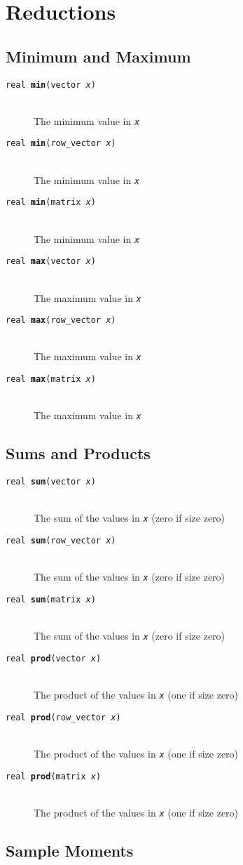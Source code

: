 \documentclass[10pt]{report}
\newcommand{\fitem}[4]{\item[{\tt #1 {\bfseries #2}(#3)}]\mbox{ } \\[4pt] #4}
\newcommand{\farg}[1]{{\tt\slshape #1}}
\begin{document}
\section{Reductions}

\subsection{Minimum and Maximum}

\begin{description}
%
\fitem{real}{min}{vector \farg{x}}{
The minimum value in \farg{x}}
%
\fitem{real}{min}{row\_vector \farg{x}}{
The minimum value in \farg{x}}
%
\fitem{real}{min}{matrix \farg{x}}{
The minimum value in \farg{x}}
%
\fitem{real}{max}{vector \farg{x}}{
The maximum value in \farg{x}}
%
\fitem{real}{max}{row\_vector \farg{x}}{
The maximum value in \farg{x}}
%
\fitem{real}{max}{matrix \farg{x}}{
The maximum value in \farg{x}}
%
\end{description}

\subsection{Sums and Products}

\begin{description}
%
\fitem{real}{sum}{vector \farg{x}}{
The sum of the values in \farg{x} (zero if size zero)}
%
\fitem{real}{sum}{row\_vector \farg{x}}{
The sum of the values in \farg{x} (zero if size zero)}
%
\fitem{real}{sum}{matrix \farg{x}}{
The sum of the values in \farg{x} (zero if size zero)}
%
%
\fitem{real}{prod}{vector \farg{x}}{
The product of the values in \farg{x} (one if size zero)}
%
\fitem{real}{prod}{row\_vector \farg{x}}{
The product of the values in \farg{x} (one if size zero)}
%
\fitem{real}{prod}{matrix \farg{x}}{
The product of the values in \farg{x} (one if size zero)}
%
\end{description}



\subsection{Sample Moments}
\end{document}

